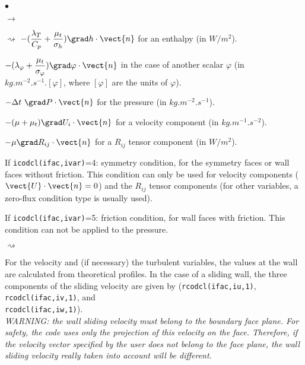 {{{\begin{list}{$\bullet$}{}
\begin{list}{$\rightarrow$}{}
\begin{list}{$\rightsquigarrow$}{}
$\displaystyle -(\frac{\lambda_T}{C_p}+\frac{\mu_t}{\sigma_h})\grad h\cdot\vect{n}$
     for an enthalpy (in $W/m^2$).

$\displaystyle -(\lambda_\varphi+\frac{\mu_t}{\sigma_\varphi})\grad\varphi\cdot\vect{n}$ in the case of another scalar $\varphi$ (in $kg.m^{-2}.s^{-1}.[\varphi]$, where $[\varphi]$ are the units of $\varphi$).

\item $-\Delta t\ \grad P\cdot\vect{n}$ for the pressure (in $kg.m^{-2}.s^{-1}$).

\item $-(\mu+\mu_t)\grad U_i\cdot\vect{n}$ for a velocity component (in $kg.m^{-1}.s^{-2}$).

\item $-\mu\grad R_{ij}\cdot\vect{n}$ for a $R_{ij}$ tensor component (in $W/m^2$).
\end{list}

\end{list}

\item If \texttt{icodcl(ifac,ivar)}=4: symmetry condition, for the symmetry
      faces or wall faces without friction. This condition can only be
      used for velocity components ($\vect{U}\cdot\vect{n}=0$) and
      the $R_{ij}$ tensor components (for other variables, a zero-flux
      condition type is usually used).\\

\item If \texttt{icodcl(ifac,ivar)}=5: friction condition, for wall faces
      with friction. This condition can not be applied to the pressure.
\begin{list}{$\rightsquigarrow$}{}
\item For the velocity and (if necessary) the turbulent variables, the
      values at the wall are calculated from theoretical profiles. In
      the case of a sliding wall, the three components of the sliding
      velocity are given by (\texttt{rcodcl(ifac,iu,1)},
      \texttt{rcodcl(ifac,iv,1)}, and \\\texttt{rcodcl(ifac,iw,1)}).\\
{\em WARNING: the wall sliding velocity must belong to the boundary face
      plane. For safety, the code uses only the projection of this
      velocity on the face. Therefore, if the velocity vector specified
      by the user does not belong to the face plane, the wall sliding velocity really
      taken into account will be different.}


\end{list}
\end{list}}}}
